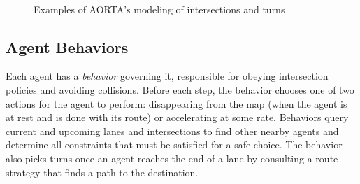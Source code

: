 \documentclass[letterpaper, 10 pt, conference]{ieeeconf}  %
\begin{document}
\begin{figure}[h]
  \centering
  ~ %
  \caption{Examples of AORTA's modeling of intersections and turns}
  \vspace{-15pt}
\end{figure}

\subsection{Agent Behaviors}

Each agent has a \emph{behavior} governing it, responsible for obeying
intersection policies and avoiding collisions. Before each step, the behavior
chooses one of two actions for the agent to perform: disappearing from the map
(when the agent is at rest and is done with its route) or accelerating at some
rate. Behaviors query current and upcoming lanes and intersections to find
other nearby agents and determine all constraints that must be satisfied for a
safe choice. The behavior also picks turns once an agent reaches the end of a
lane by consulting a route strategy that finds a path to the destination.
\end{document}
